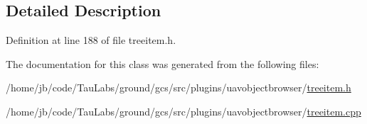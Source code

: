 \subsection{\-Detailed \-Description}


\-Definition at line 188 of file treeitem.\-h.



\-The documentation for this class was generated from the following files\-:\begin{DoxyCompactItemize}
\item 
/home/jb/code/\-Tau\-Labs/ground/gcs/src/plugins/uavobjectbrowser/\hyperlink{treeitem_8h}{treeitem.\-h}\item 
/home/jb/code/\-Tau\-Labs/ground/gcs/src/plugins/uavobjectbrowser/\hyperlink{treeitem_8cpp}{treeitem.\-cpp}\end{DoxyCompactItemize}
